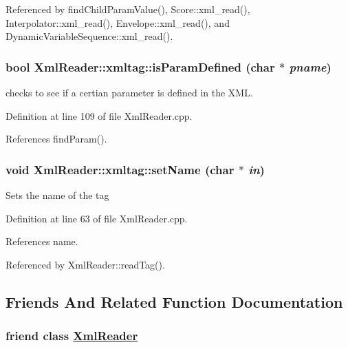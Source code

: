Referenced by find\-Child\-Param\-Value(), Score::xml\_\-read(), Interpolator::xml\_\-read(), Envelope::xml\_\-read(), and Dynamic\-Variable\-Sequence::xml\_\-read().\hypertarget{classXmlReader_1_1xmltag_a4}{
\subsubsection[isParamDefined]{\setlength{\rightskip}{0pt plus 5cm}bool Xml\-Reader::xmltag::is\-Param\-Defined (char $\ast$ {\em pname})}}
\label{classXmlReader_1_1xmltag_a4}


checks to see if a certian parameter is defined in the XML. 

Definition at line 109 of file Xml\-Reader.cpp.

References find\-Param().\hypertarget{classXmlReader_1_1xmltag_a2}{
\subsubsection[setName]{\setlength{\rightskip}{0pt plus 5cm}void Xml\-Reader::xmltag::set\-Name (char $\ast$ {\em in})}}
\label{classXmlReader_1_1xmltag_a2}


Sets the name of the tag 

Definition at line 63 of file Xml\-Reader.cpp.

References name.

Referenced by Xml\-Reader::read\-Tag().

\subsection{Friends And Related Function Documentation}
\hypertarget{classXmlReader_1_1xmltag_n0}{
\subsubsection[XmlReader]{\setlength{\rightskip}{0pt plus 5cm}friend class \hyperlink{classXmlReader}{Xml\-Reader}}}
\label{classXmlReader_1_1xmltag_n0}




